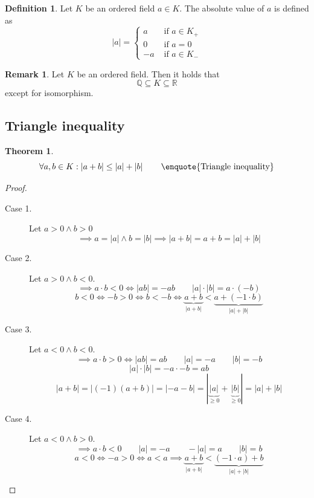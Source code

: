 \documentclass[a4paper,landscape,twocolumn]{article}
\theoremstyle{definition}
\newtheorem{theorem}{Theorem}
\newtheorem{defi}{Definition}
\newtheorem{rem}{Remark}
\newcommand\abs[1]{\left|#1\right|}
\begin{document}
\begin{defi}
  Let $K$ be an ordered field $a \in K$.
  The absolute value of $a$ is defined as
  \[
    \abs{a} = \begin{cases}
      a & \text{ if } a \in K_+ \\
      0 & \text{ if } a = 0 \\
      -a & \text{ if } a \in K_-
    \end{cases}
  \]
\end{defi}

\begin{rem}
  Let $K$ be an ordered field. Then it holds that
  \[ \mathbb{Q} \subseteq K \subseteq \mathbb{R} \]
  except for isomorphism.
\end{rem}

\subsection{Triangle inequality}
\begin{theorem}
  \[ \forall a, b \in K: \abs{a + b} \leq \abs{a} + \abs{b} \qquad \text{\enquote{Triangle inequality}} \]
\end{theorem}
\begin{proof}
  \begin{description}
    \item[Case 1.] Let $a > 0 \land b > 0$
      \[ \implies a = \abs{a} \land b = \abs{b} \implies \abs{a + b} = a + b = \abs{a} + \abs{b} \]
    \item[Case 2.] Let $a > 0 \land b < 0$.
      \[ \implies a \cdot b < 0 \iff \abs{ab} = -ab \qquad \abs{a} \cdot \abs{b} = a \cdot (-b) \]
      \[ b < 0 \iff -b > 0 \iff b < -b \iff \underbrace{a + b}_{\abs{a + b}} < \underbrace{a + (-1 \cdot b)}_{\abs{a} + \abs{b}} \]
    \item[Case 3.] Let $a < 0 \land b < 0$.
      \[ \implies a \cdot b > 0 \iff \abs{ab} = ab \qquad \abs{a} = -a \qquad \abs{b} = -b  \]
      \[ \abs{a} \cdot \abs{b} = -a \cdot -b = a b \]
      \[ \abs{a + b} = \abs{(-1)(a + b)} = \abs{-a-b} = \abs{\underbrace{\abs{a}}_{\geq 0} + \underbrace{\abs{b}}_{\geq 0}} = \abs{a} + \abs{b} \]
    \item[Case 4.] Let $a < 0 \land b > 0$.
      \[ \implies a \cdot b < 0 \qquad \abs{a} = -a \qquad -\abs{a} = a \qquad \abs{b} = b \] 
      \[ a < 0 \iff -a > 0 \iff a < a \implies \underbrace{a + b}_{\abs{a + b}} < \underbrace{(-1 \cdot a) + b}_{\abs{a} + \abs{b}} \]
  \end{description}
\end{proof}
\end{document}
